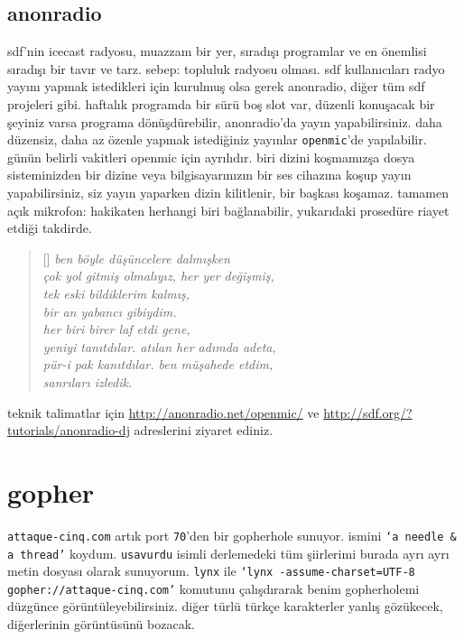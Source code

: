 \documentclass[9pt, a5paper, twocolumn, openright]{memoir}
\begin{document}
\subsection{anonradio}
sdf'nin icecast radyosu, muazzam bir yer, sıradışı programlar ve en
önemlisi sıradışı bir tavır ve tarz. sebep: topluluk radyosu olması. sdf
kullanıcıları radyo yayını yapmak istedikleri için kurulmuş olsa gerek
anonradio, diğer tüm sdf projeleri gibi. haftalık programda bir sürü boş
slot var, düzenli konuşacak bir şeyiniz varsa programa dönüşdürebilir,
anonradio'da yayın yapabilirsiniz. daha düzensiz, daha az özenle yapmak
istediğiniz yayınlar \texttt{openmic}'de yapılabilir. günün belirli
vakitleri openmic için ayrılıdır. biri dizini koşmamızşa dosya
sisteminizden bir dizine veya bilgisayarınızın bir ses cihazına koşup
yayın yapabilirsiniz, siz yayın yaparken dizin kilitlenir, bir başkası
koşamaz. tamamen açık mikrofon: hakikaten herhangi biri bağlanabilir,
yukarıdaki prosedüre riayet etdiği takdirde.
\begin{verse}[\versewidth]
  \itshape{}
  ben böyle düşüncelere dalmışken\\
  çok yol gitmiş olmalıyız, her yer değişmiş,\\
  tek eski bildiklerim kalmış,\\
  bir an yabancı gibiydim.\\
  her biri birer laf etdi gene,\\
  yeniyi tanıtdılar. atılan her adımda adeta,\\
  pür-i pak kanıtdılar. ben müşahede etdim,\\
  sanrıları izledik.\\
\end{verse}
teknik talimatlar için \url{http://anonradio.net/openmic/} ve
\url{http://sdf.org/?tutorials/anonradio-dj} adreslerini ziyaret ediniz.
\section{gopher}
\texttt{attaque-cinq.com} artık port \texttt{70}'den bir gopherhole
sunuyor. ismini \texttt{`a needle \& a thread'} koydum.
\texttt{usavurdu} isimli derlemedeki tüm şiirlerimi burada ayrı ayrı
metin dosyası olarak sunuyorum. \texttt{lynx} ile \texttt{`lynx
  -assume-charset=UTF-8 gopher://attaque-cinq.com'} komutunu
çalışdırarak benim gopherholemi düzgünce görüntüleyebilirsiniz.
diğer türlü türkçe karakterler yanlış gözükecek, diğerlerinin
görüntüsünü bozacak.
\end{document}
